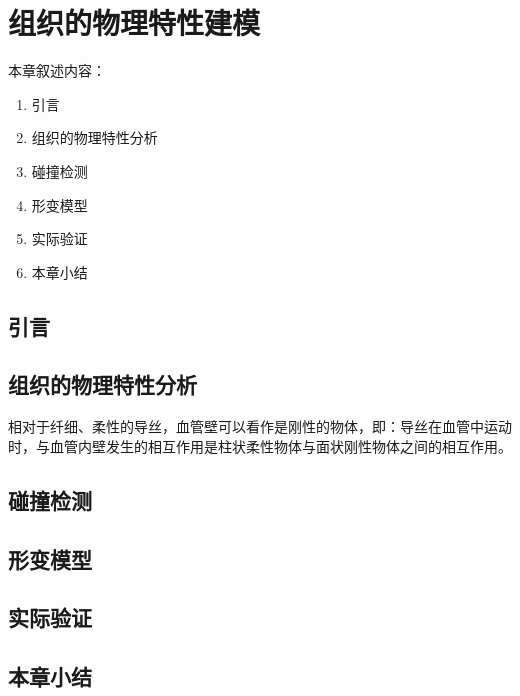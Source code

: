 \chapter{组织的物理特性建模}
\label{chap7}

本章叙述内容：
\begin{enumerate}
  \item 引言
  \item 组织的物理特性分析
  \item 碰撞检测
  \item 形变模型
  \item 实际验证
  \item 本章小结
\end{enumerate}

\section{引言}

\section{组织的物理特性分析}

相对于纤细、柔性的导丝，血管壁可以看作是刚性的物体\cite{BroNielsen1997DK}，即：导丝在血管中运动时，与血管内壁发生的相互作用是柱状柔性物体与面状刚性物体之间的相互作用。

\section{碰撞检测}

\section{形变模型}

\section{实际验证}

\section{本章小结}
